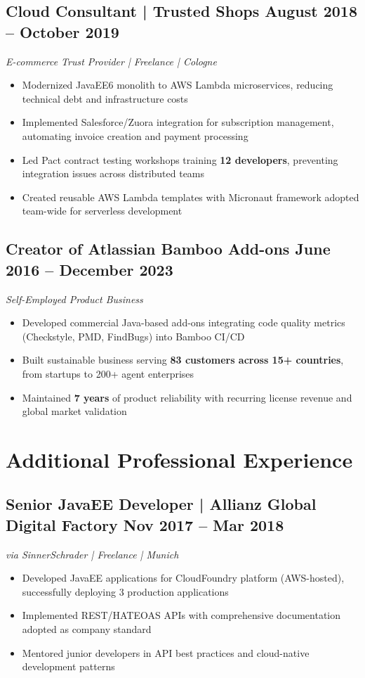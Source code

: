 \documentclass[10pt,a4paper]{article}
\begin{document}
\subsection*{Cloud Consultant | Trusted Shops \hfill August 2018 -- October 2019}
\textit{E-commerce Trust Provider | Freelance | Cologne}
\begin{itemize}
\item Modernized JavaEE6 monolith to AWS Lambda microservices, reducing technical debt and infrastructure costs
\item Implemented Salesforce/Zuora integration for subscription management, automating invoice creation and payment processing
\item Led Pact contract testing workshops training \textbf{12 developers}, preventing integration issues across distributed teams
\item Created reusable AWS Lambda templates with Micronaut framework adopted team-wide for serverless development
\end{itemize}

\subsection*{Creator of Atlassian Bamboo Add-ons \hfill June 2016 -- December 2023}
\textit{Self-Employed Product Business}
\begin{itemize}
\item Developed commercial Java-based add-ons integrating code quality metrics (Checkstyle, PMD, FindBugs) into Bamboo CI/CD
\item Built sustainable business serving \textbf{83 customers across 15+ countries}, from startups to 200+ agent enterprises
\item Maintained \textbf{7 years} of product reliability with recurring license revenue and global market validation
\end{itemize}

\newpage

\section*{Additional Professional Experience}

\subsection*{Senior JavaEE Developer | Allianz Global Digital Factory \hfill Nov 2017 -- Mar 2018}
\textit{via SinnerSchrader | Freelance | Munich}
\begin{itemize}
\item Developed JavaEE applications for CloudFoundry platform (AWS-hosted), successfully deploying 3 production applications
\item Implemented REST/HATEOAS APIs with comprehensive documentation adopted as company standard
\item Mentored junior developers in API best practices and cloud-native development patterns
\end{itemize}
\end{document}
